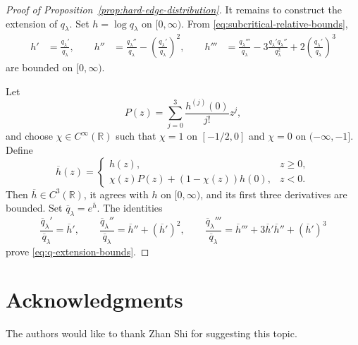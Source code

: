 \documentclass[12pt,preprint]{amsart}
\numberwithin{equation}{section}
\theoremstyle{plain}
\theoremstyle{definition}
\begin{document}
\begin{proof}[Proof of Proposition~\ref{prop:hard-edge-distribution}]
It remains to construct the extension of $q_{\lambda}$.  Set
$h=\log q_{\lambda}$ on $[0,\infty)$.  From
\eqref{eq:subcritical-relative-bounds},
\[
\begin{aligned}
 h'&=\frac{q_{\lambda}'}{q_{\lambda}},\qquad
 h''&=\frac{q_{\lambda}''}{q_{\lambda}}
      -\left(\frac{q_{\lambda}'}{q_{\lambda}}\right)^2,\qquad
 h'''&=\frac{q_{\lambda}'''}{q_{\lambda}}
      -3\frac{q_{\lambda}'q_{\lambda}''}{q_{\lambda}^2}
      +2\left(\frac{q_{\lambda}'}{q_{\lambda}}\right)^3
\end{aligned}
\]
are bounded on $[0,\infty)$.

 Let
\[
 P(z)=\sum_{j=0}^3\frac{h^{(j)}(0)}{j!}z^j,
\]
and choose $\chi\in C^\infty(\mathbb R)$ such that
$\chi=1$ on $[-1/2,0]$ and $\chi=0$ on $(-\infty,-1]$.  Define
\[
 \overline h(z)=
 \begin{cases}
  h(z),&z\ge0,\\
  \chi(z)P(z)+(1-\chi(z))h(0),&z<0.
 \end{cases}
\]
Then $\overline h\in C^3(\mathbb R)$, it agrees with $h$ on
$[0,\infty)$, and its first three derivatives are bounded.  Set
$\overline q_{\lambda}=e^{\overline h}$.  The identities
\[
 {
 \frac{\overline q_{\lambda}'}{\overline q_{\lambda}}
 =\overline h',
 \qquad
 \frac{\overline q_{\lambda}''}{\overline q_{\lambda}}
 =\overline h''+(\overline h')^2,
 \qquad
 \frac{\overline q_{\lambda}'''}{\overline q_{\lambda}}
 =\overline h'''+3\overline h'\overline h''+(\overline h')^3}
\]
prove \eqref{eq:q-extension-bounds}.
\end{proof}


\section*{Acknowledgments}
The authors would like to thank Zhan Shi for suggesting this topic.

%
%
%
%
%
%
%
%
%
%
%
%
%
%
%
%
%
%
%
%
%
%
%
%
%
%
%
%
\end{document}
